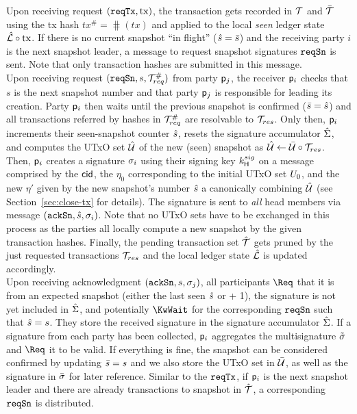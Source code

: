 \quad Upon receiving request $(\mathtt{reqTx},\mathrm{tx})$, the transaction gets
recorded in ${\mathcal T}$ and $\bar {\mathcal T}$ using the tx hash $tx^{\#} = \hash(tx)$ and applied to the
local \emph{seen} ledger state $\hat {\mathcal L} \circ \mathrm{tx}$. If there is no current
snapshot ``in flight'' ($\hat s = \bar s$) and the receiving party $i$ is the next
snapshot leader, a message to request snapshot signatures $\mathtt{reqSn}$ is sent. Note
that only transaction hashes are submitted in this message. \\

\quad Upon receiving request $(\mathtt{reqSn},s,{\mathcal T}^{\#}_{req})$
from party $\mathsf p_j$, the receiver $\mathsf p_i$ checks that $s$ is the next
snapshot number and that party $\mathsf p_j$ is responsible for leading its
creation. Party $\mathsf p_i$ then waits until the previous
snapshot is confirmed ($\bar s = \hat s$) and all transactions referred by hashes
in ${\mathcal T}^{\#}_{req}$ are resolvable to ${\mathcal T}_{res}$. Only then, $\mathsf p_i$
increments their seen-snapshot counter $\hat s$, resets the signature accumulator
$\hat{\Sigma}$, and computes the UTxO set $\hat {\mathcal U}$ of the new (seen) snapshot as
$\hat {\mathcal U} \gets \bar {\mathcal U} \circ {\mathcal T}_{res}$. Then, $\mathsf p_i$ creates a signature
$\sigma_i$ using their signing key $k^{sig}_\mathsf{H}$ on a message comprised by
the $\mathsf{cid}$, the $\eta_{0}$ corresponding to the initial UTxO set $U_{0}$, and
the new $\eta'$ given by the new snapshot's number $\hat s$ a canonically
combining $\hat {\mathcal U}$ (see Section~\ref{sec:close-tx} for details). The signature
is sent to \emph{all} head members via message $(\mathtt{ackSn},\hat s,\sigma_i)$. Note
that no UTxO sets have to be exchanged in this process as the parties all
locally compute a new snapshot by the given transaction hashes. Finally, the
pending transaction set $\hat {\mathcal T}$ gets pruned by the just requested transactions
${\mathcal T}_{res}$ and the
local ledger state $\hat {\mathcal L}$ is updated accordingly.\\

\quad Upon receiving acknowledgment $(\mathtt{ackSn},s,\sigma_j)$,
all participants $\Req$ that it is from an expected snapshot (either the last
seen $\hat s$ or + 1), the signature is not yet included in $\hat{\Sigma}$, and
potentially $\KwWait$ for the corresponding $\mathtt{reqSn}$ such that $\hat s = s$. They
store the received signature in the signature accumulator $\hat{\Sigma}$. If a
signature from each party has been collected, $\mathsf p_i$ aggregates the
multisignature $\tilde\sigma$ and $\Req$ it to be valid.  If everything is fine, the snapshot can be considered confirmed by
updating $\bar s=s$ and we also store the UTxO set in $\bar {\mathcal U}$, as well as the
signature in $\bar{\sigma}$ for later reference. Similar to the $\mathtt{reqTx}$, if
$\mathsf p_i$ is the next snapshot leader and there are already transactions to
snapshot in $\hat {\mathcal T}$, a corresponding $\mathtt{reqSn}$ is distributed.

